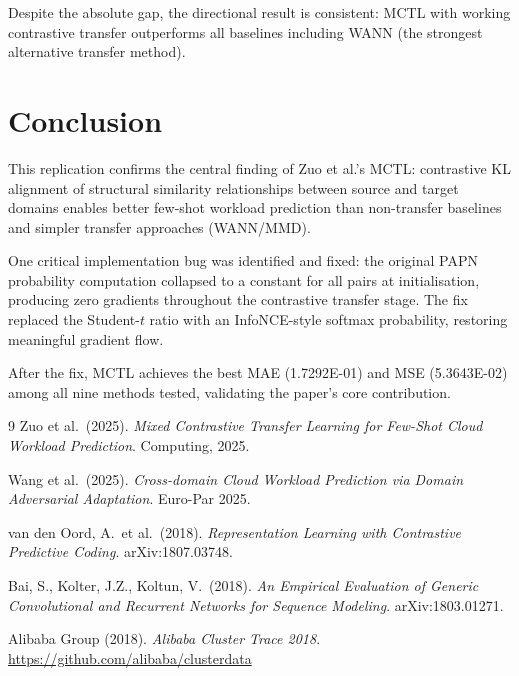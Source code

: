 \documentclass[12pt,a4paper]{article}
\begin{document}
Despite the absolute gap, the directional result is consistent: MCTL with
working contrastive transfer outperforms all baselines including WANN (the
strongest alternative transfer method).

\section{Conclusion}

This replication confirms the central finding of Zuo et al.'s MCTL: contrastive
KL alignment of structural similarity relationships between source and target
domains enables better few-shot workload prediction than non-transfer baselines
and simpler transfer approaches (WANN/MMD).

One critical implementation bug was identified and fixed: the original PAPN
probability computation collapsed to a constant for all pairs at initialisation,
producing zero gradients throughout the contrastive transfer stage.  The fix
replaced the Student-$t$ ratio with an InfoNCE-style softmax probability,
restoring meaningful gradient flow.

After the fix, MCTL achieves the best MAE (1.7292E-01) and MSE (5.3643E-02)
among all nine methods tested, validating the paper's core contribution.

\begin{thebibliography}{9}
Zuo et al.\ (2025).
\textit{Mixed Contrastive Transfer Learning for Few-Shot Cloud Workload
Prediction}. Computing, 2025.

Wang et al.\ (2025).
\textit{Cross-domain Cloud Workload Prediction via Domain Adversarial Adaptation}.
Euro-Par 2025.

van den Oord, A.\ et al.\ (2018).
\textit{Representation Learning with Contrastive Predictive Coding}.
arXiv:1807.03748.

Bai, S., Kolter, J.Z., Koltun, V.\ (2018).
\textit{An Empirical Evaluation of Generic Convolutional and Recurrent Networks
for Sequence Modeling}. arXiv:1803.01271.

Alibaba Group (2018). \textit{Alibaba Cluster Trace 2018}.
\url{https://github.com/alibaba/clusterdata}
\end{thebibliography}
\end{document}
